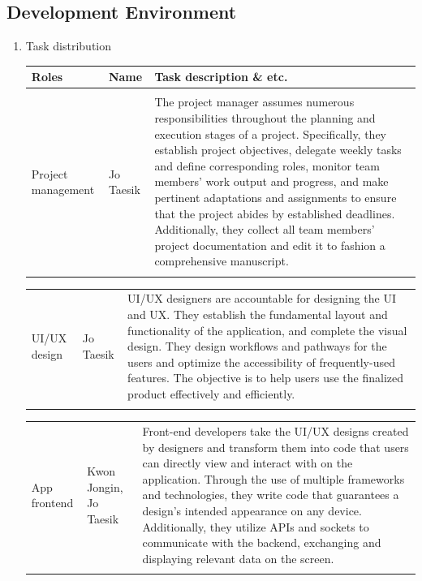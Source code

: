 \documentclass[11pt, conference]{IEEEtran}
\begin{document}
\begin{enumerate}[label=\arabic*.]
\section{\Large{Development Environment}}
\begin{enumerate}[label=\arabic*]
    \item {\large{Task distribution}}
    \begin{table}[H]
    \center
    \begin{tabular}{m{1.4cm} m{1.5cm} m{4cm}}
    \toprule
    Roles & Name & Task description \& etc.\\
    \midrule
    \\
    Project management & Jo Taesik & The project manager assumes numerous responsibilities throughout the planning and execution stages of a project. Specifically, they establish project objectives, delegate weekly tasks and define corresponding roles, monitor team members' work output and progress, and make pertinent adaptations and assignments to ensure that the project abides by established deadlines. Additionally, they collect all team members' project documentation and edit it to fashion a comprehensive manuscript. \\\\
    \bottomrule
    \end{tabular}
    \end{table}
    
    \begin{table}[H]
    \center
    \begin{tabular}{m{1.4cm} m{1.5cm} m{4cm}}
    UI/UX design & Jo Taesik & UI/UX designers are accountable for designing the UI and UX. They establish the fundamental layout and functionality of the application, and complete the visual design. They design workflows and pathways for the users and optimize the accessibility of frequently-used features. The objective is to help users use the finalized product effectively and efficiently. \\\\
    \bottomrule
    \end{tabular}
    \end{table}

    \begin{table}[H]
    \center
    \begin{tabular}{m{1.4cm} m{1.5cm} m{4cm}}
    App frontend & Kwon Jongin, Jo Taesik & Front-end developers take the UI/UX designs created by designers and transform them into code that users can directly view and interact with on the application. Through the use of multiple frameworks and technologies, they write code that guarantees a design’s intended appearance on any device. Additionally, they utilize APIs and sockets to communicate with the backend, exchanging and displaying relevant data on the screen. \\\\
    \bottomrule
    \end{tabular}
    \end{table}


\end{enumerate}
\end{enumerate}
\end{document}
